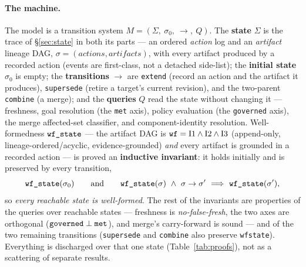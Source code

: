 \documentclass[11pt]{article}
\newcommand{\codeus}{\textunderscore\penalty100\relax}
\newcommand{\code}[1]{\texttt{\let\_\codeus #1}}
\begin{document}
\paragraph{The machine.} The model is a transition system $M = (\Sigma,\ \sigma_0,\ {\rightarrow},\ Q)$. The
\textbf{state} $\Sigma$ is the trace of \S\ref{sec:state} in both its parts --- an ordered \emph{action} log
and an \emph{artifact} lineage DAG, $\sigma = (\mathit{actions}, \mathit{artifacts})$, with every artifact
produced by a recorded action (events are first-class, not a detached side-list); the \textbf{initial state}
$\sigma_0$ is empty; the \textbf{transitions} ${\rightarrow}$ are \code{extend} (record an action and the
artifact it produces), \code{supersede} (retire a target's current revision), and the two-parent
\code{combine} (a merge); and the \textbf{queries} $Q$ read the state without changing it --- freshness, goal
resolution (the \code{met} axis), policy evaluation (the \code{governed} axis), the merge affected-set
classifier, and component-identity resolution. Well-formedness $\code{wf\_state}$ --- the artifact DAG is
$\code{wf} = \mathrm{I1} \wedge \mathrm{I2} \wedge \mathrm{I3}$ (append-only, lineage-ordered/acyclic,
evidence-grounded) \emph{and} every artifact is grounded in a recorded action --- is proved an
\textbf{inductive invariant}: it holds initially and is preserved by every transition,
\[
  \code{wf\_state}(\sigma_0)
  \qquad\text{and}\qquad
  \code{wf\_state}(\sigma)\ \wedge\ \sigma \rightarrow \sigma' \ \Longrightarrow\ \code{wf\_state}(\sigma'),
\]
so \emph{every reachable state is well-formed}. The rest of the invariants are properties of the queries
over reachable states --- freshness is \emph{no-false-fresh}, the two axes are orthogonal
($\code{governed} \perp \code{met}$), and merge's carry-forward is sound --- and of the two remaining
transitions (\code{supersede} and \code{combine} also preserve \code{wf\_state}). Everything is discharged over
that one state (Table~\ref{tab:proofs}), not as a scattering of separate results.
\end{document}
